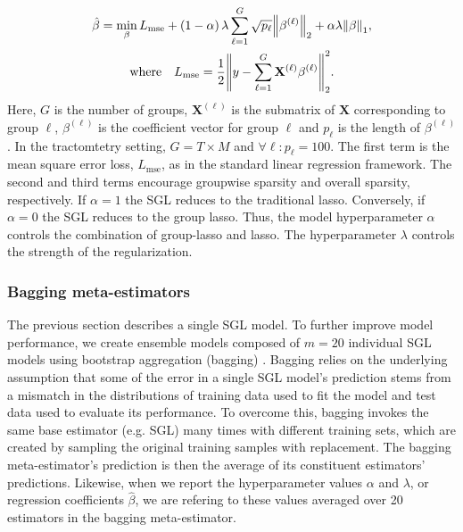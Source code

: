 \documentclass[10pt,letterpaper]{article}
\begin{document}
\begin{multline}
    \hat{\beta} = \min_\beta L_{\text{mse}}
    + \left( 1 - \alpha \right) \lambda \displaystyle \sum_{\ell = 1}^{G}
    \sqrt{p_\ell} \norm{\beta^{(\ell)}}_2
    + \alpha \lambda \norm{\beta}_1,\\%
    \text{where} \quad
    L_{\text{mse}} = \frac{1}{2}
    \norm{y - \displaystyle \sum_{\ell = 1}^{G}
    \mathbf{X}^{(\ell)} \beta^{(\ell)}}_2^2.
    \label{eq:sgl}
\end{multline}
Here, $G$ is the number of groups, $\mathbf{X}^{(\ell)}$ is the submatrix of
$\mathbf{X}$ corresponding to group $\ell$, $\beta^{(\ell)}$ is the
coefficient vector for group $\ell$ and $p_\ell$ is the length of
$\beta^{(\ell)}$. In the tractomtetry setting, $G = T \times M$ and $\forall
\ell: p_\ell = 100$. The first term is the mean square error loss,
$L_{\text{mse}}$, as in the standard linear regression framework. The second
and third terms encourage groupwise sparsity and overall sparsity,
respectively. If $\alpha = 1$ the SGL reduces to the traditional
lasso\cite{tibshirani1996regression}. Conversely, if $\alpha = 0$ the SGL
reduces to the group lasso\cite{yuan2006model}. Thus, the model
hyperparameter $\alpha$ controls the combination of group-lasso and lasso.
The hyperparameter $\lambda$ controls the strength of the regularization.

\subsubsection*{Bagging meta-estimators}

The previous section describes a single SGL model. To further improve model
performance, we create ensemble models composed of $m = 20$ individual SGL
models using bootstrap aggregation (bagging) \cite{breiman1996bagging}.
Bagging relies on the underlying assumption that some of the error in a
single SGL model's prediction stems from a mismatch in the distributions of
training data used to fit the model and test data used to evaluate its
performance. To overcome this, bagging invokes the same base estimator (e.g.
SGL) many times with different training sets, which are created by sampling
the original training samples with replacement. The bagging meta-estimator's
prediction is then the average of its constituent estimators' predictions.
Likewise, when we report the hyperparameter values $\alpha$ and $\lambda$, or
regression coefficients $\hat{\beta}$, we are refering to these values
averaged over 20 estimators in the bagging meta-estimator.
\end{document}
